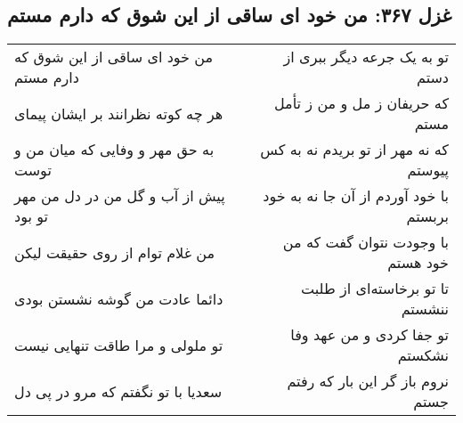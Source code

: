 \begin{center}
\section*{غزل ۳۶۷: من خود ای ساقی از این شوق که دارم مستم}
\label{sec:367}
\begin{longtable}{l p{0.5cm} r}
من خود ای ساقی از این شوق که دارم مستم
&&
تو به یک جرعه دیگر ببری از دستم
\\
هر چه کوته نظرانند بر ایشان پیمای
&&
که حریفان ز مل و من ز تأمل مستم
\\
به حق مهر و وفایی که میان من و توست
&&
که نه مهر از تو بریدم نه به کس پیوستم
\\
پیش از آب و گل من در دل من مهر تو بود
&&
با خود آوردم از آن جا نه به خود بربستم
\\
من غلام توام از روی حقیقت لیکن
&&
با وجودت نتوان گفت که من خود هستم
\\
دائما عادت من گوشه نشستن بودی
&&
تا تو برخاسته‌ای از طلبت ننشستم
\\
تو ملولی و مرا طاقت تنهایی نیست
&&
تو جفا کردی و من عهد وفا نشکستم
\\
سعدیا با تو نگفتم که مرو در پی دل
&&
نروم باز گر این بار که رفتم جستم
\\
\end{longtable}
\end{center}
